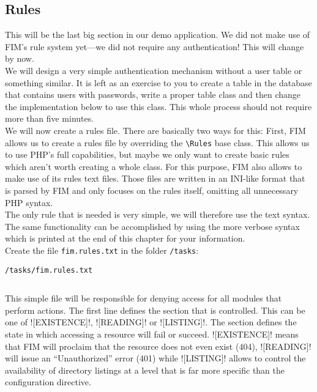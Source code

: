 \documentclass{scrartcl}
\begin{document}
   \subsection{Rules} \label{rules}
      This will be the last big section in our demo application. We did not make use of FIM's rule system yet---we did not require any authentication! This will change by now. \\
      We will design a very simple authentication mechanism without a user table or something similar. It is left as an exercise to you to create a table in the database that contains users with passwords, write a proper table class and then change the implementation below to use this class. This whole process should not require more than five minutes. \\
      We will now create a rules file. There are basically two ways for this: First, FIM allows us to create a rules file by overriding the \lstinline!\Rules! base class. This allows us to use PHP's full capabilities, but maybe we only want to create basic rules which aren't worth creating a whole class. For this purpose, FIM also allows to make use of its rules text files. Those files are written in an INI-like format that is parsed by FIM and only focuses on the rules itself, omitting all unnecessary PHP syntax. \\
      The only rule that is needed is very simple, we will therefore use the text syntax. The same functionality can be accomplished by using the more verbose syntax which is printed at the end of this chapter for your information. \\
      Create the file \texttt{fim.rules.txt} in the folder \texttt{/tasks}:
      \begin{listing}[H]
         \caption{\texttt{/tasks/fim.rules.txt}}
         \inputminted{fimrule}{demo/content/tasks/fim.rules.txt}
      \end{listing}
      This simple file will be responsible for denying access for all modules that perform actions. The first line defines the section that is controlled. This can be one of \fimrule![EXISTENCE]!, \fimrule![READING]! or \fimrule![LISTING]!. The section defines the state in which accessing a resource will fail or succeed. \fimrule![EXISTENCE]! means that FIM will proclaim that the resource does not even exist (404), \fimrule![READING]! will issue an ``Unauthorized'' error (401) while \fimrule![LISTING]! allows to control the availability of directory listings at a level that is far more specific than the configuration directive. \\
\end{document}
